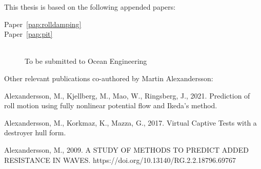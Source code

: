 

This thesis is based on the following appended papers:

\begin{description}
\item[Paper~\ref{pap:rolldamping}]
\begin{minipage}[adjusting]{0.85\textwidth}
\end{minipage}

\item[Paper~\ref{pap:pit}]
\begin{minipage}[adjusting]{0.85\textwidth}
\\
To be submitted to Ocean Engineering
\end{minipage}

\end{description}

\vspace{1cm}

\noindent Other relevant publications co-authored by Martin Alexandersson:
\begin{description}
\normalsize
\newcommand{\ME}{{\bfseries Martin Alexandersson}}

\item
{}

\item
Alexandersson, M., Kjellberg, M., Mao, W., Ringsberg, J., 2021. Prediction of roll motion using fully nonlinear potential flow and Ikeda’s method.

\item
Alexandersson, M., Korkmaz, K., Mazza, G., 2017. Virtual Captive Tests with a destroyer hull form.

\item
Alexandersson, M., 2009. A STUDY OF METHODS TO PREDICT ADDED RESISTANCE IN WAVES. https://doi.org/10.13140/RG.2.2.18796.69767

\end{description}

